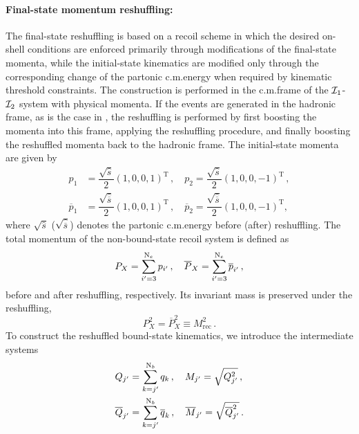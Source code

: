 \paragraph{Final-state momentum reshuffling:}
The final-state reshuffling is based on a recoil scheme in which the desired on-shell conditions are enforced primarily through modifications of the final-state momenta, while the initial-state kinematics are modified only through the corresponding change of the partonic c.m.\@ energy when required by kinematic threshold constraints. The construction is performed in the c.m.\@ frame of the ${\cal I}_1$-${\cal I}_2$ system with physical momenta. If the events are generated in the hadronic frame, as is the case in \mgshort, the reshuffling is performed by first boosting the momenta into this frame, applying the reshuffling procedure, and finally boosting the reshuffled momenta back to the hadronic frame. The initial-state momenta are given by
\begin{align}
    p_1 & = \dfrac{\sqrt{\hat s}}{2}(1,0,0,1)^\mathrm{T}\,,\quad p_2 = \dfrac{\sqrt{\hat s}}{2}(1,0,0,-1)^\mathrm{T}\,,\\
    \overline{p}_1 & = \dfrac{\sqrt{\hat{\overline{s}}}}{2}(1,0,0,1)^\mathrm{T}\,,\quad \overline{p}_2 = \dfrac{\sqrt{\hat{\overline{s}}}}{2}(1,0,0,-1)^\mathrm{T},
\end{align}
where $\sqrt{\hat s}$ ($\sqrt{\hat{\overline{s}}}$) denotes the partonic c.m.\@ energy before (after) reshuffling. The total momentum of the non-bound-state recoil system is defined as
\begin{equation}
    P_X = \sum_{i^\prime=3}^{{\rm N}_e} p_{i^\prime}\,,\quad \overline{P}_X = \sum_{i^\prime=3}^{{\rm N}_e} \overline{p}_{i^\prime}\,,
\end{equation}
before and after reshuffling, respectively. Its invariant mass is preserved under the reshuffling,
\begin{equation}
    P_X^2=\overline{P}_X^2\equiv M_\mathrm{rec}^2\,.
\end{equation}
To construct the reshuffled bound-state kinematics, we introduce the intermediate systems
\begin{align}
    &Q_{j^\prime} = \sum_{k=j^\prime}^{{\rm N}_b} q_k\,,\quad M_{j^\prime} = \sqrt{Q_{j^\prime}^2}\,,\label{eq:invM}\\
    &\overline{Q}_{j^\prime} = \sum_{k=j^\prime}^{{\rm N}_b} \overline{q}_{k}\,,\quad \overline{M}_{j^\prime} = \sqrt{\overline{Q}_{j^\prime}^2}\,.\label{eq:invOverlineM}
\end{align}
